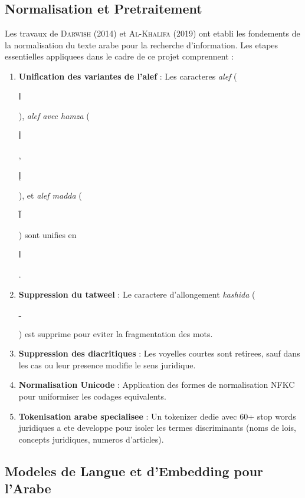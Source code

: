 \subsection{Normalisation et Pretraitement}

Les travaux de \textsc{Darwish} (2014) et \textsc{Al-Khalifa} (2019) ont etabli les fondements de la normalisation du texte arabe pour la recherche d'information. Les etapes essentielles appliquees dans le cadre de ce projet comprennent :

\begin{enumerate}
    \item \textbf{Unification des variantes de l'alef} : Les caracteres \textit{alef} (\begin{otherlanguage}{arabic}ا\end{otherlanguage}), \textit{alef avec hamza} (\begin{otherlanguage}{arabic}أ\end{otherlanguage}, \begin{otherlanguage}{arabic}إ\end{otherlanguage}), et \textit{alef madda} (\begin{otherlanguage}{arabic}آ\end{otherlanguage}) sont unifies en \begin{otherlanguage}{arabic}ا\end{otherlanguage}.
    \item \textbf{Suppression du tatweel} : Le caractere d'allongement \textit{kashida} (\begin{otherlanguage}{arabic}ـ\end{otherlanguage}) est supprime pour eviter la fragmentation des mots.
    \item \textbf{Suppression des diacritiques} : Les voyelles courtes sont retirees, sauf dans les cas ou leur presence modifie le sens juridique.
    \item \textbf{Normalisation Unicode} : Application des formes de normalisation NFKC pour uniformiser les codages equivalents.
    \item \textbf{Tokenisation arabe specialisee} : Un tokenizer dedie avec 60+ stop words juridiques a ete developpe pour isoler les termes discriminants (noms de lois, concepts juridiques, numeros d'articles).
\end{enumerate}

\subsection{Modeles de Langue et d'Embedding pour l'Arabe}

